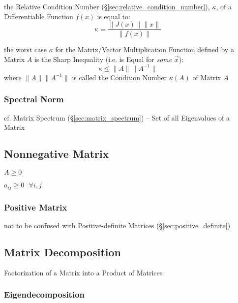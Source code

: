 the Relative Condition Number (\S\ref{sec:relative_condition_number}),
$\kappa$, of a Differentiable Function $f(x)$ is equal to:
\[
  \kappa = \frac{\|J(x)\| \|x\|}{\|f(x)\|}
\]

the worst case $\kappa$ for the Matrix/Vector Multiplication Function defined
by a Matrix $A$ is the Sharp Inequality (i.e. is Equal for \emph{some}
$\vec{x}$):
\[
  \kappa \leq \|A\|\|A^{-1}\|
\]
where $\|A\|\|A^{-1}\|$ is called the Condition Number $\kappa(A)$ of Matrix
$A$



\subsubsection{Spectral Norm}\label{sec:spectral_norm}

cf. Matrix Spectrum (\S\ref{sec:matrix_spectrum}) -- Set of all Eigenvalues of
a Matrix



\subsection{Nonnegative Matrix}\label{sec:nonnegative_matrix}

$A \geq 0$

$a_{ij} \geq 0 \ \ \ \forall i,j$



\subsubsection{Positive Matrix}\label{sec:positive_matrix}

\fist not to be confused with Positive-definite Matrices
(\S\ref{sec:positive_definite})



\subsection{Matrix Decomposition}\label{sec:matrix_decomposition}

Factorization of a Matrix into a Product of Matrices



\subsubsection{Eigendecomposition}\label{sec:eigendecomposition}

